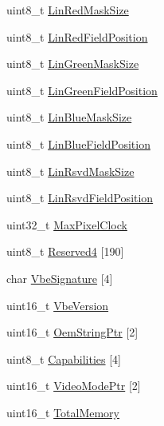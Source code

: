 \begin{DoxyCompactItemize}
\item 
uint8\+\_\+t \hyperlink{struct____attribute_____a1fbcef2402fe6ce7f6c006bd50eaa6da}{Lin\+Red\+Mask\+Size}
\item 
uint8\+\_\+t \hyperlink{struct____attribute_____aff962b58f86a77f12b412d47125a4993}{Lin\+Red\+Field\+Position}
\item 
uint8\+\_\+t \hyperlink{struct____attribute_____af235e505028771ab2fb84778f4dfb476}{Lin\+Green\+Mask\+Size}
\item 
uint8\+\_\+t \hyperlink{struct____attribute_____a6683a63711dbc5dfb9a2a59c55deecd5}{Lin\+Green\+Field\+Position}
\item 
uint8\+\_\+t \hyperlink{struct____attribute_____ad8a25cec803bf91fb40a20a0aa5d5bf7}{Lin\+Blue\+Mask\+Size}
\item 
uint8\+\_\+t \hyperlink{struct____attribute_____a3f38d6becbe961786cd7ab58ec37fc07}{Lin\+Blue\+Field\+Position}
\item 
uint8\+\_\+t \hyperlink{struct____attribute_____a334886fc9a915ff91966c3aac1da586a}{Lin\+Rsvd\+Mask\+Size}
\item 
uint8\+\_\+t \hyperlink{struct____attribute_____a3df070e698b5f54814e20c8813f7bf7e}{Lin\+Rsvd\+Field\+Position}
\item 
uint32\+\_\+t \hyperlink{struct____attribute_____ab1fbd72846963ebb34a308a7edf7bbe1}{Max\+Pixel\+Clock}
\item 
uint8\+\_\+t \hyperlink{struct____attribute_____a2e13c4795a00241b919aa3aab86560ce}{Reserved4} \mbox{[}190\mbox{]}
\item 
char \hyperlink{struct____attribute_____afd3a8744ce19caa07755c2604cce884c}{Vbe\+Signature} \mbox{[}4\mbox{]}
\item 
uint16\+\_\+t \hyperlink{struct____attribute_____a7b9fef89774326b46f9481cbd9a397d3}{Vbe\+Version}
\item 
uint16\+\_\+t \hyperlink{struct____attribute_____a40bb36a43f8b3c4f8e9640007c5da428}{Oem\+String\+Ptr} \mbox{[}2\mbox{]}
\item 
uint8\+\_\+t \hyperlink{struct____attribute_____a555521aede0ff448231fc7a404862bdb}{Capabilities} \mbox{[}4\mbox{]}
\item 
uint16\+\_\+t \hyperlink{struct____attribute_____a3ae7b3b608ba57d8db68ddfa47d31d01}{Video\+Mode\+Ptr} \mbox{[}2\mbox{]}
\item 
uint16\+\_\+t \hyperlink{struct____attribute_____a3e7b41e709394a10b3667e7f27f1aa7a}{Total\+Memory}
\end{DoxyCompactItemize}


